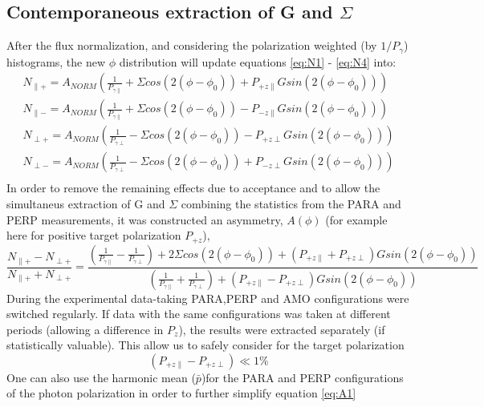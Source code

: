 \subsection{Contemporaneous extraction of G and \texorpdfstring{$\Sigma$}{Sigma}}
After the flux normalization, and considering the polarization weighted (by $1/P_{\gamma}$) histograms, the new $\phi$ distribution will update equations \ref{eq:N1} - \ref{eq:N4} into:
\begin{eqnarray}
N_{\parallel +} = A_{NORM} \left( \frac{1}{P_{\gamma \parallel}} + \Sigma cos(2(\phi-\phi_0)) +  P_{+z\parallel} G sin(2(\phi-\phi_0)) \right) \label{eq:UN1}\\
N_{\parallel -} = A_{NORM} \left(\frac{1}{P_{\gamma \parallel}} + \Sigma cos(2(\phi-\phi_0)) - P_{-z\parallel} G sin(2(\phi-\phi_0)) \right) \label{eq:UN2}\\
N_{\perp +} = A_{NORM} \left( \frac{1}{P_{\gamma \perp}} - \Sigma cos(2(\phi-\phi_0)) -  P_{+z\perp} G sin(2(\phi-\phi_0)) \right) \label{eq:UN3}\\
N_{\perp -} = A_{NORM} \left( \frac{1}{P_{\gamma \perp}} - \Sigma cos(2(\phi-\phi_0)) +  P_{-z\perp} G sin(2(\phi-\phi_0)) \right) \label{eq:UN4}\\
\end{eqnarray}
In order to remove the remaining effects due to acceptance and to allow the simultaneus extraction of G and $\Sigma$ combining the statistics from the PARA and PERP measurements, it was constructed an asymmetry, $A(\phi)$ (for example here for positive target polarization $P_{+z}$),
\begin{equation}
  \frac{N_{\parallel +} - N_{\perp +}}{N_{\parallel +} + N_{\perp +}} = \frac{ (\frac{1}{P_{\gamma \parallel}} - \frac{1}{P_{\gamma \perp}}) + 2 \Sigma cos(2(\phi-\phi_0)) +  (P_{+z\parallel}+P_{+z\perp}) G sin(2(\phi-\phi_0))}{(\frac{1}{P_{\gamma \parallel}} + \frac{1}{P_{\gamma \perp}}) +(P_{+z\parallel}-P_{+z\perp}) G sin(2(\phi-\phi_0))} \label{eq:A1}
\end{equation}
During the experimental data-taking PARA,PERP and AMO configurations were switched regularly. If data with the same configurations was taken at different periods (allowing a difference in $P_z$), the results were extracted separately (if statistically valuable). This allow us to safely consider for the target polarization
\begin{equation}
  (P_{+z\parallel}-P_{+z\perp}) \ll 1 \% 
\end{equation}
One can also use the harmonic mean ($\bar{p}$)for the PARA and PERP configurations of the photon polarization in order to further simplify equation \ref{eq:A1} 
